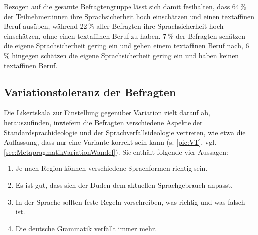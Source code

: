 
Bezogen auf die gesamte Befragtengruppe lässt sich damit festhalten, dass 64\,\% der Teilnehmer:innen ihre Sprachsicherheit hoch einschätzen und einen textaffinen Beruf ausüben, während 22\,\% aller Befragten ihre Sprachsicherheit hoch einschätzen, ohne einen textaffinen Beruf zu haben.
7\,\% der Befragten schätzen die eigene Sprachsicherheit gering ein und gehen einem textaffinen Beruf nach, 6\,\% hingegen schätzen die eigene Sprachsicherheit gering ein und haben keinen textaffinen Beruf. %
\subsection{Variationstoleranz der Befragten}
\label{sec:Variationstoleranz}
Die Likertskala zur Einstellung gegenüber Variation zielt darauf ab, herauszufinden, inwiefern die Befragten verschiedene Aspekte der Standardsprachideologie und der Sprachverfallsideologie vertreten, wie etwa die Auffassung, dass nur eine Variante korrekt sein kann (s. \autoref{pic:VT}, vgl. \autoref{sec:MetapragmatikVariationWandel}). 
Sie enthält folgende vier Aussagen: 
\begin{enumerate}
\item Je nach Region können verschiedene Sprachformen richtig sein. 
\item Es ist gut, dass sich der Duden dem aktuellen Sprachgebrauch anpasst.
\item In der Sprache sollten feste Regeln vorschreiben, was richtig und was falsch ist. 
\item Die deutsche Grammatik verfällt immer mehr. 
\end{enumerate}

